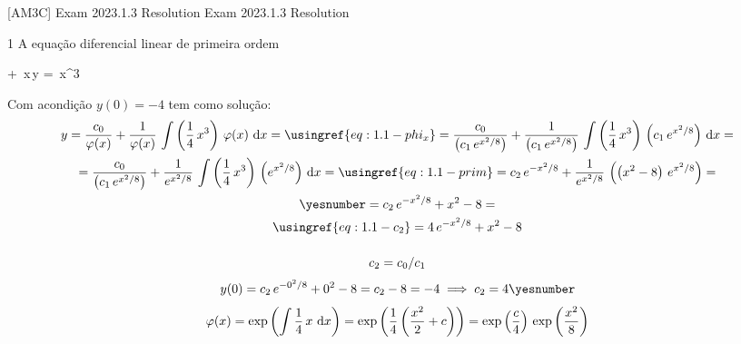 \documentclass["AM3C-tests_resolutions.tex"]{subfiles}
\begin{document}

[AM3C]
{Exam 2023.1.3 Resolution} %
{Exam 2023.1.3 Resolution} %

\group{}

\begin{questionBox}1{} %
  A equação diferencial linear de primeira ordem
  \begin{BM}
    + \,x\,y
    = \,x^3
  \end{BM}
  Com acondição \(y(0) = -4\) tem como solução:
  \answer{}
  \begin{gather*}\label{eq:1.1-y}
    y
    = \frac{c_0}{\varphi(x)}
    + \frac{1  }{\varphi(x)}
    \,\int{\left(\frac{1}{4}\,x^3\right)\,\varphi(x)\,\odif{x}}
    = 
    \usingref{eq:1.1-phi_x}
    = \frac{c_0}{\left(c_1\,e^{x^2/8}\right)}
    + \frac{1  }{\left(c_1\,e^{x^2/8}\right)}
    \,\int{\left(\frac{1}{4}\,x^3\right)\,\left(c_1\,e^{x^2/8}\right)\,\odif{x}}
    = \\ 
    = \frac{c_0}{\left(c_1\,e^{x^2/8}\right)}
    + \frac{1  }{e^{x^2/8}}
    \,\int{\left(\frac{1}{4}\,x^3\right)\,\left(e^{x^2/8}\right)\,\odif{x}}
    = 
    \usingref{eq:1.1-prim}
    = c_2\,e^{-x^2/8}
    + \frac{1}{e^{x^2/8}}
    \,\left(
      \left(x^2-8\right)\,e^{x^2/8}
    \right)
    = \\ 
    \yesnumber
    = c_2\,e^{-x^2/8}
    + x^2-8
    = \\ 
    \usingref{eq:1.1-c_2}
    = 4\,e^{-x^2/8} + x^2 - 8
    \\[3ex]
    c_2 = c_0/c_1
  \end{gather*}
  \begin{gather*}\label{eq:1.1-c_2}
    y(0)
    = c_2\,e^{-0^2/8}+ 0^2 - 8
    = c_2 - 8
    = - 4
    \implies c_2 = 4
    \yesnumber
  \end{gather*}
  \begin{gather*} \label{eq:1.1-phi_x}
    \varphi(x) 
    = \exp{\left(
      \int{\frac{1}{4}\,x\,\odif{x}}
    \right)}
    = \exp{\left(
      \frac{1}{4} \left( \frac{x^2}{2} + c \right)
    \right)}
    = \exp{\left( \frac{c}{4} \right)}
    \,\exp{\left(
      \frac{x^2}{8}
    \right)}

\end{gather*}
\end{questionBox}
\end{document}
